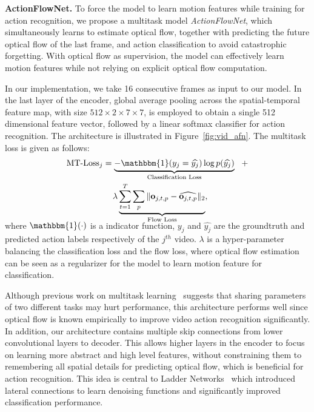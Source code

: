 \documentclass[10pt,twocolumn,letterpaper]{article}
\begin{document}
\noindent\textbf{ActionFlowNet.}
To force the model to learn motion features while training for action recognition, we propose a multitask model \emph{ActionFlowNet}, which simultaneously learns to estimate optical flow, together with predicting the future optical flow of the last frame, and action classification to avoid catastrophic forgetting.
With optical flow as supervision, the model can effectively learn motion features while not relying on explicit optical flow computation.

In our implementation, we take 16 consecutive frames as input to our model.
In the last layer of the encoder, global average pooling across the spatial-temporal feature map, with size $512 \times 2\times 7 \times 7$, is employed to obtain a single 512 dimensional feature vector, followed by a linear softmax classifier for action recognition.  The architecture is illustrated in Figure~\ref{fig:vid_afn}.
The multitask loss is given as follows:
\vspace{-1em}\begin{multline} 
    \text{MT-Loss}_{j} = \underbrace{-\mathbbm{1}(y_j = \widehat{y_j})\log p(\widehat{y_j})}_{\text{Classification Loss}}~~ +\\
    ~~\lambda \underbrace{\sum_{t=1}^T\sum_{p} \|\mathbf{o}_{j,t,p} - \widehat{\mathbf{o}_{j,t,p}} \|_2}_{\text{Flow Loss}},
\label{eq:multi_mt_loss}
  \vspace{-1em}
\end{multline}
where $\mathbbm{1}(\cdot)$ is a indicator function, $y_j$ and $\widehat{y_j}$ are the groundtruth and predicted action labels respectively of the $j^{th}$ video.
$\lambda$ is a hyper-parameter balancing the classification loss and the flow loss, where optical flow estimation can be seen as a regularizer for the model to learn motion feature for classification.

Although previous work on multitask learning~\cite{misraSGH16} suggests that sharing parameters of two different tasks may hurt performance, this architecture performs well since optical flow is known empirically to improve video action recognition significantly.
In addition, our architecture contains multiple skip connections from lower convolutional layers to decoder.
This allows higher layers in the encoder to focus on learning more abstract and high level features, without constraining them to remembering all spatial details for predicting optical flow, which is beneficial for action recognition.
This idea is central to Ladder Networks~\cite{rasmusVHBR15} which introduced lateral connections to learn denoising functions and significantly improved classification performance.
\end{document}
